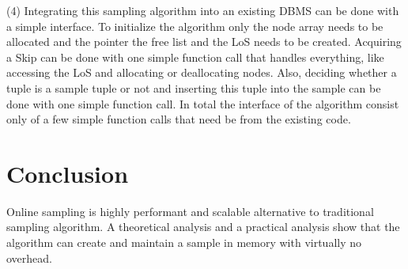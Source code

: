 \documentclass[sigconf,nonacm]{acmart}
\begin{document}
        (4) Integrating this sampling algorithm into an existing DBMS can be done with a simple interface. To initialize the algorithm only the node array needs to be allocated and the pointer the free list and the LoS needs to be created. Acquiring a Skip can be done with one simple function call that handles everything, like accessing the LoS and allocating or deallocating nodes. Also, deciding whether a tuple is a sample tuple or not and inserting this tuple into the sample can be done with one simple function call. In total the interface of the algorithm consist only of a few simple function calls that need be from the existing code.

    \section{Conclusion}
        Online sampling is highly performant and scalable alternative to traditional sampling algorithm. A theoretical analysis and a practical analysis show that the algorithm can create and maintain a sample in memory with virtually no overhead.

    
    
\end{document}
